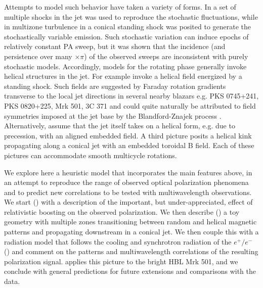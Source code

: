 Attempts to model such behavior have taken a variety of forms. In \citet{hughes_synchrotron_1989} a set of multiple shocks in the jet was used to reproduce the stochastic fluctuations, while in \citet{marscher_turbulent_2014} multizone turbulence in a conical standing shock was posited to generate the stochastically variable emission. Such stochastic variation can induce epochs of relatively constant PA sweep, but it was shown \citep{blinov_robopol:_2016} that the incidence (and persistence over many $\times \pi$) of the observed sweeps are inconsistent with purely stochastic models. Accordingly, models for the rotating phase generally invoke helical structures in the jet. For example \citet{zhang_polarization_2015} invoke a helical field energized by a standing shock. Such fields are suggested by Faraday rotation gradients transverse to the local jet directions in several nearby blazars e.g. PKS 0745+241, PKS 0820+225, Mrk 501, 3C 371 \citep{gabuzda_helical_2004} and could quite naturally be attributed to field symmetries imposed at the jet base by the Blandford-Znajek process \citep{blandford_electromagnetic_1977}. Alternatively, \citet{lyutikov_polarization_2017} assume that the jet itself takes on a helical form, e.g. due to precession, with an aligned embedded field. A third picture \citep{nalewajko_model_2017} posits a helical kink propagating along a conical jet with an embedded toroidal B field. Each of these pictures can accommodate smooth multicycle rotations.

We explore here a heuristic model that incorporates the main features above, in an attempt to reproduce the range of observed optical polarization phenomena and to predict new correlations to be tested with multiwavelength observations. We start () with a description of the important, but under-appreciated, effect of relativistic boosting on the observed polarization. We then describe () a toy geometry with multiple zones transitioning between random and helical magnetic patterns and propagating downstream in a conical jet. We then couple this with a radiation model that follows the cooling and synchrotron radiation of the $e^+/e^-$ () and comment on the patterns and multiwavelength correlations of the resulting polarization signal.  applies this picture to the bright HBL Mrk 501, and we conclude with general predictions for future extensions and comparisons with the data.

